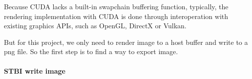 Because CUDA lacks a built-in swapchain buffering function, typically, 
the rendering implementation with CUDA is done through interoperation with existing graphics APIs, such as OpenGL, DirectX or Vulkan.

But for this project, we only need to render image to a host buffer and write to a png file. So the first step is to find a way to export image.

\paragraph{STBI write image}

